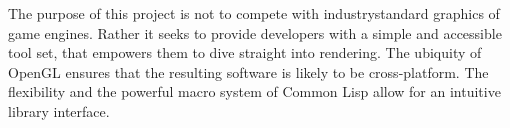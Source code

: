 The purpose of this project is not to compete with industry\-standard graphics of game engines.
Rather it seeks to provide developers with a simple and accessible tool set,
that empowers them to dive straight into rendering.
The ubiquity of OpenGL ensures that the resulting software is likely to be cross-platform\cite{khronos}.
The flexibility and the powerful macro system of Common Lisp allow for an intuitive library interface\cite{practical_cl}.
